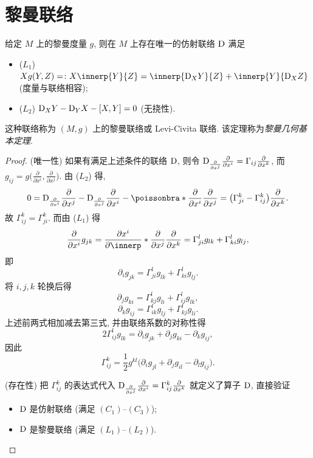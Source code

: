 \section{黎曼联络}



\begin{theorem}
  给定 $M$ 上的黎曼度量 $g$, 则在 $M$ 上存在唯一的仿射联络 $\mathrm{D}$ 满足
  \begin{itemize}
    \item ($L_1$) $Xg(Y,Z)=\colon X\innerp{Y}{Z}=\innerp{\D_X Y}{Z}+\innerp{Y}{\D_X Z}$ (度量与联络相容);
    \item ($L_2$) $\mathrm{D}_XY - \mathrm{D}_YX - [X,Y] = 0$ (无挠性).
  \end{itemize}
  这种联络称为 $(M,g)$ 上的黎曼联络或 Levi-Civita 联络.
  该定理称为\emph{黎曼几何基本定理}.
\end{theorem}

\begin{proof}
  (唯一性) 如果有满足上述条件的联络 $\mathrm{D}$, 则令
  $\mathrm{D}_{\frac{\partial}{\partial x^j}}\frac{\partial}{\partial x^i} = \Gamma_{ij}\frac{\partial}{\partial x^k}$,
  而 $g_{ij} = g\bigl(\frac{\partial}{\partial x^i}, \frac{\partial}{\partial x^j}\bigr)$.
  由 ($L_2$) 得,
  \[0 = \D_{\pdv{x^i}}\pdv{x^j} - \D_{\pdv{x^j}}\pdv{x^i} - \poissonbra*{\pdv{x^i}}{\pdv{x^j}}
    = \bigl(\Gamma_{ji}^k-\Gamma_{ij}^k\bigr)\pdv{x^k}.\]
  故 $\Gamma_{ij}^k = \Gamma_{ji}^k$. 而由 ($L_1$) 得
  \[\pdv{x^i}g_{jk} = \pdv{x^i}\innerp*{\pdv{x^j}}{\pdv{x^k}} 
    = \Gamma_{ji}^l g_{lk} + \Gamma_{ki}^l g_{lj},\]
  即
  \[\partial_i g_{jk} = \Gamma_{ji}^l g_{lk} + \Gamma_{ki}^l g_{lj}.\]
  将 $i,j,k$ 轮换后得
  \[\partial_j g_{ki} = \Gamma_{kj}^l g_{li} + \Gamma_{ij}^l g_{lk},\]
  \[\partial_k g_{ij} = \Gamma_{ik}^l g_{lj} + \Gamma_{kj}^l g_{li}.\]
  上述前两式相加减去第三式, 并由联络系数的对称性得
  \[2\Gamma_{ij}^l g_{lk} = \partial_i g_{jk} + \partial_j g_{ki} - \partial_k g_{ij},\]
  因此
  \[\Gamma_{ij}^k = \frac{1}{2}g^{kl} \bigl(\partial_i g_{jl} + \partial_j g_{il} - \partial_l g_{ij}\bigr).\]

  (存在性) 把 $\Gamma_{ij}^k$ 的表达式代入 $\mathrm{D}_{\pdv{x^j}}\pdv{x^i} = \Gamma_{ij}^k\pdv{x^k}$
  就定义了算子 $\mathrm{D}$, 直接验证
  \begin{itemize}
    \item $\mathrm{D}$ 是仿射联络 (满足 $(C_1)$--$(C_3)$);
    \item $\mathrm{D}$ 是黎曼联络 (满足 $(L_1)$--$(L_2)$).\qedhere
  \end{itemize}
\end{proof}


